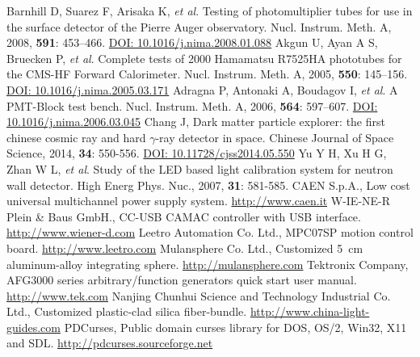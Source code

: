 \documentclass{nst}
\begin{document}
\begin{thebibliography}{99}
	 Barnhill D, Suarez F, Arisaka K, \emph{et al}. Testing of photomultiplier tubes for use in the surface detector of the {Pierre} {Auger} observatory. Nucl. Instrum. Meth. A, 2008, {\bf 591}: 453--466.
	\href{http://dx.doi.org/10.1016/j.nima.2008.01.088}{DOI: 10.1016/j.nima.2008.01.088}
	 Akgun U, Ayan A S, Bruecken P, \emph{et al}. Complete tests of 2000 {Hamamatsu} {R}7525HA phototubes for the {CMS}-{HF} {Forward} {Calorimeter}. Nucl. Instrum. Meth. A, 2005, {\bf 550}: 145--156.
	\href{http://dx.doi.org/10.1016/j.nima.2005.03.171}{DOI: 10.1016/j.nima.2005.03.171}
	 Adragna P, Antonaki A, Boudagov I, \emph{et al}. A {PMT}-{Block} test bench. Nucl. Instrum. Meth. A, 2006, {\bf 564}: 597--607.
	\href{http://dx.doi.org/10.1016/j.nima.2006.03.045}{DOI: 10.1016/j.nima.2006.03.045}
	 Chang J, Dark matter particle explorer: the first chinese cosmic ray and hard $\gamma$-ray detector in space. Chinese Journal of Space Science, 2014, {\bf 34}: 550-556.
	\href{http://dx.doi.org/10.11728/cjss2014.05.550}{DOI: 10.11728/cjss2014.05.550}
	 Yu Y H, Xu H G, Zhan W L, \emph{et al}. Study of the LED based light calibration system for neutron wall detector. High Energ Phys. Nuc., 2007, {\bf 31}: 581-585.
	 {CAEN S.p.A.}, Low cost universal multichannel power supply system. \href{http://www.caen.it/csite/CaenProd.jsp?idmod=491&parent=20}{http://www.caen.it}
	 {W-IE-NE-R Plein \& Baus GmbH.}, {CC-USB CAMAC controller with USB interface}. \href{http://www.wiener-d.com/sc/modules/camac--modules/cc-usb.html}{http://www.wiener-d.com}
	 {Leetro Automation Co. Ltd.}, {MPC07SP motion control board}. \href{http://www.leetro.com/english/}{http://www.leetro.com}
	 {Mulansphere Co. Ltd.}, {Customized \SI{5}{cm} aluminum-alloy integrating sphere}. \href{http://mulansphere.com/e-index.html/}{http://mulansphere.com}
	 {Tektronix Company}, {AFG3000 series arbitrary/function generators quick start user manual}. \href{http://www.tek.com/signal-generator/afg3000-function-generator/}{http://www.tek.com}
	 Nanjing Chunhui Science and Technology Industrial Co. Ltd., Customized plastic-clad silica fiber-bundle.  \href{http://www.china-light-guides.com/}{http://www.china-light-guides.com}
	 PDCurses,  Public domain curses library for DOS, OS/2, Win32, X11 and SDL. \href{http://pdcurses.sourceforge.net/}{http://pdcurses.sourceforge.net}

\end{thebibliography}
\end{document}
